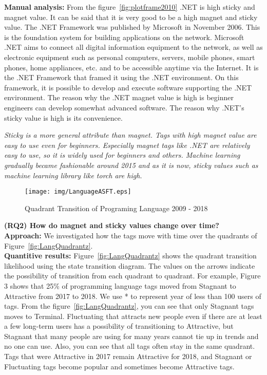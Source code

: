 \documentclass[conference]{IEEEtran}
\begin{document}
\textbf{Manual analysis:}
From the figure~\ref{fig:plotframe2010} .NET is high sticky and magnet value. It can be said that it is very good to be a high magnet and sticky value. The .NET Framework was published by Microsoft in November 2006. This is the foundation system for building applications on the network.  Microsoft .NET aims to connect all digital information equipment to the network, as well as electronic equipment such as personal computers, servers, mobile phones, smart phones, home appliances, etc. and to be accessible anytime via the Internet. It is the .NET Framework that framed it using the .NET environment. On this framework, it is possible to develop and execute software supporting the .NET environment. The reason why the .NET magnet value is high is beginner engineers can develop somewhat advanced software. The reason why .NET's sticky value is high is its convenience.
\medskip
 
\begin{oframed}
 \emph{Sticky is a more general attribute than magnet. Tags with high magnet value are easy to use even for beginners. Especially magnet tags like .NET are relatively easy to use, so it is widely used for beginners and others. Machine learning gradually became fashionable around 2015 and as it is now, sticky values such as machine learning library like torch are high.}
\end{oframed}
\medskip



\begin{figure*}[t]
 \centering
 \texttt{[image: img/LanguageASFT.eps]}  
 \caption{Quadrant Transition of Programing Language 2009 - 2018} 
 \label{fig:LangQuadrant} 
\end{figure*}


\textbf{(RQ2) How do magnet and sticky values change over time?} \\
\smallskip\smallskip
\textbf{Approach:}
We investigated how the tags move with time over the quadrants of Figure~\ref{fig:LangQuadrantz}. \\
\textbf{Quantitive results:}
Figure~\ref{fig:LangQuadrantz} shows the quadrant transition likelihood using the state transition diagram. The values ​​on the arrows indicate the possibility of transition from each quadrant to quadrant. For example, Figure 3 shows that 25\% of programming language tags moved from Stagnant to Attractive from 2017 to 2018. We use * to represent year of less than 100 users of tags.
From the figure~\ref{fig:LangQuadrantz}, you can see that only Stagnant tags moves to Terminal. Fluctuating that attracts new people even if there are at least a few long-term users has a possibility of transitioning to Attractive, but Stagnant that many people are using for many years cannot tie up in trends and no one can use. Also, you can see that all tags often stay in the same quadrant. Tags that were Attractive in 2017 remain Attractive for 2018, and Stagnant or Fluctuating tags become popular and sometimes become Attractive tags.
\smallskip\smallskip
\end{document}
